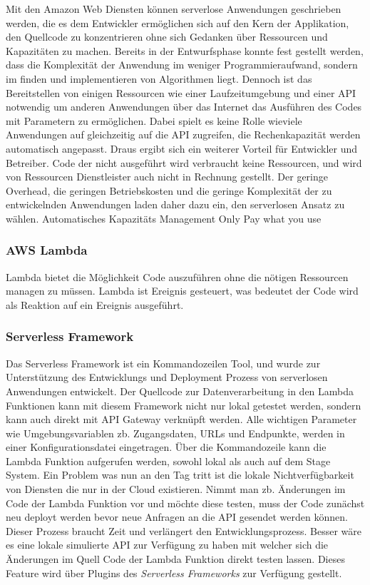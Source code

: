 Mit den Amazon Web Diensten können serverlose Anwendungen geschrieben werden, die es dem Entwickler ermöglichen sich auf den Kern der Applikation, den Quellcode zu konzentrieren ohne sich Gedanken über Ressourcen und Kapazitäten zu machen. Bereits in der Entwurfsphase konnte fest gestellt werden, dass die Komplexität der Anwendung im weniger Programmieraufwand, sondern im finden und implementieren von Algorithmen liegt. Dennoch ist das Bereitstellen von einigen Ressourcen wie einer Laufzeitumgebung und einer API notwendig um anderen Anwendungen über das Internet das Ausführen des Codes mit Parametern zu ermöglichen. Dabei spielt es keine Rolle wieviele Anwendungen auf gleichzeitig auf die API zugreifen, die Rechenkapazität werden automatisch angepasst. Draus ergibt sich ein weiterer Vorteil für Entwickler und Betreiber. Code der nicht ausgeführt wird verbraucht keine Ressourcen, und wird von Ressourcen Dienstleister auch nicht in Rechnung gestellt. 
Der geringe Overhead, die geringen Betriebskosten und die geringe Komplexität der zu entwickelnden Anwendungen laden daher dazu ein, den serverlosen Ansatz zu wählen. 
Automatisches Kapazitäts Management
Only Pay what you use
 

\subsubsection{AWS Lambda}

Lambda bietet die Möglichkeit Code auszuführen ohne die nötigen Ressourcen managen zu müssen. Lambda ist Ereignis gesteuert, was bedeutet der Code wird als Reaktion auf ein Ereignis ausgeführt. 
\subsubsection{Serverless Framework}
Das Serverless Framework ist ein Kommandozeilen Tool, und wurde zur Unterstützung des Entwicklungs und Deployment Prozess von serverlosen Anwendungen entwickelt. 
Der Quellcode zur Datenverarbeitung in den Lambda Funktionen kann mit diesem Framework nicht nur lokal getestet werden, sondern kann auch direkt mit API Gateway verknüpft werden. Alle wichtigen Parameter wie Umgebungsvariablen zb. Zugangsdaten, URLs und Endpunkte, werden in einer Konfigurationsdatei eingetragen.  Über die Kommandozeile kann die Lambda Funktion aufgerufen werden, sowohl lokal als auch auf dem Stage System. 
Ein Problem was nun an den Tag tritt ist die lokale Nichtverfügbarkeit von Diensten die nur in der Cloud existieren. Nimmt man zb. Änderungen im Code der Lambda Funktion vor und möchte diese testen, muss der Code zunächst neu deployt werden bevor neue Anfragen an die API gesendet werden können. Dieser Prozess braucht Zeit und verlängert den Entwicklungsprozess. Besser wäre es eine lokale simulierte API zur Verfügung zu haben mit welcher sich die Änderungen im Quell Code der Lambda Funktion direkt testen lassen. Dieses Feature wird über Plugins des \textit{Serverless Frameworks} zur Verfügung gestellt.

